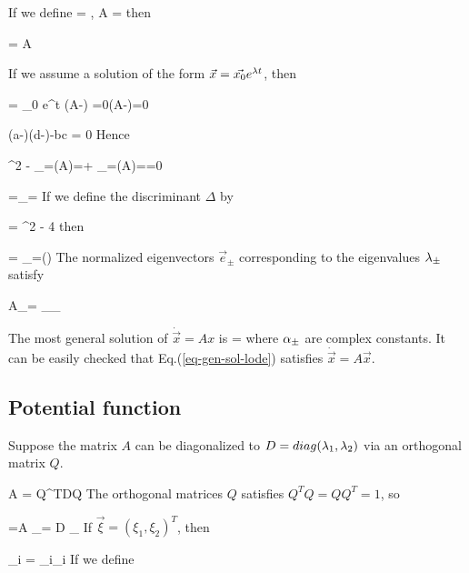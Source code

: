If we define
\beq
{} = \left[ 
\begin{array}{c}
x\\y
\end{array}
\right]
\;,\;\;
A = \left[
\begin{array}{cc}
a & b
\\
c & d
\end{array}
\right]
\eeq
then

\beq
{} = A 
\eeq


If we assume a solution of the form $\vec{x}=\vec{x_0}
e^{\lambda t}$, then


\beq 
{}= _0 e^{\lam t}
\implies 
(A-\lam)  =0\implies \det(A-\lam)=0
\eeq

\beq
 (a-\lam)(d-\lam)-bc = 0
\eeq
Hence

\beq
\lam^2 - 
_{=\tr(A)=\tau}\lam + 
_{=\det(A)=\delta}=0
\eeq

\beq
\lam =\lam_{\pm}=
\eeq
If we define the discriminant $\Delta$ by

\beq
\Delta = \tau^2 - 4 \delta
\eeq
then

\beq
\lam = \lam_\pm =(\tau\pm \sqrt{\Delta})
\eeq
The normalized eigenvectors $\vec{e}_\pm$ corresponding
to the eigenvalues $\lambda_\pm$ satisfy

\beq 
A_\pm = \lam_{\pm}_\pm
\eeq


The most general solution 
of $\dot{\vec{x}}=A x$ is
\beq
{} = 
\Re{}
\label{eq-gen-sol-lode}
\eeq
where $\alpha_\pm$ are complex constants. It can be easily checked that
Eq.(\ref{eq-gen-sol-lode}) satisfies $\dot{\vec{x}} = A \vec{x}$.

\subsection{Potential function}

Suppose the matrix $A$ can be diagonalized to $D=diag(\lambda_1, \lambda_2)$
via an orthogonal matrix $Q$.

\beq
A = Q^TDQ
\eeq
The orthogonal matrices $Q$ satisfies $Q^TQ=QQ^T=1$, so

\beq
{}=A
\implies
{}_{\dot{\vec{\xi}}}= D _{\vec{\xi}}
\eeq
If $\vec{\xi} = (\xi_1, \xi_2)^T$,
then

\beq
\dot{\xi}_i = \lam_i\xi_i\quad {}
\eeq
If we define

